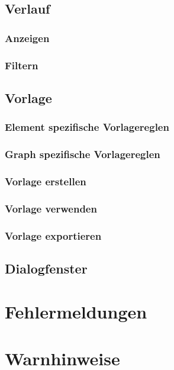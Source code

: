\documentclass[enabledeprecatedfontcommands,fontsize=11pt,paper=a4,twoside]{scrartcl}
\begin{document}
	\subsection{Verlauf} \label{logs}
		\subsubsection{Anzeigen}
		\subsubsection{Filtern}
	\subsection{Vorlage} \label{template}
		\subsubsection{Element spezifische Vorlagereglen}
		\subsubsection{Graph spezifische Vorlagereglen}
		\subsubsection{Vorlage erstellen}
		\subsubsection{Vorlage verwenden}
		\subsubsection{Vorlage exportieren}
	\subsection{Dialogfenster} \label{dialog}
	\newpage
	\section{Fehlermeldungen} \label{fehlermeldungen}
	
	
\section{Warnhinweise} \label{sec:warnhinweise}
	
\end{document}
